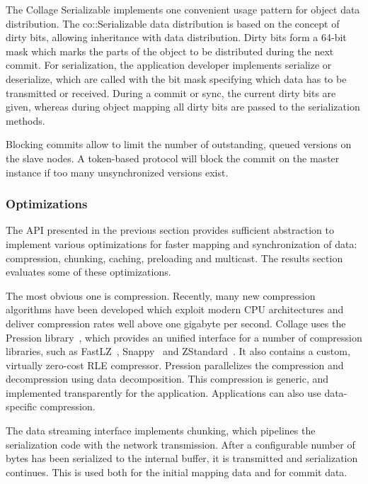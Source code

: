 \documentclass[10pt,journal,compsoc]{IEEEtran}
\begin{document}
\label{sec:Serializable}The \textsf{Collage} Serializable implements one
convenient usage pattern for object data distribution. The
\textsf{co::Serializable} data distribution is based on the concept of dirty
bits, allowing inheritance with data distribution. Dirty bits form a 64-bit mask
which marks the parts of the object to be distributed during the next commit.
For serialization, the application developer implements \textsf{serialize} or
\textsf{deserialize}, which are called with the bit mask specifying which data
has to be transmitted or received. During a commit or sync, the current dirty
bits are given, whereas during object mapping all dirty bits are passed to the
serialization methods.

Blocking commits allow to limit the number of outstanding, queued versions on
the slave nodes. A token-based protocol will block the commit on the master
instance if too many unsynchronized versions exist.

\subsubsection{Optimizations}

The API presented in the previous section provides sufficient abstraction to
implement various optimizations for faster mapping and synchronization of data:
compression, chunking, caching, preloading and multicast. The results section
evaluates some of these optimizations.

The most obvious one is compression. Recently, many new compression algorithms
have been developed which exploit modern CPU architectures and deliver
compression rates well above one gigabyte per second. \textsf{Collage} uses the
Pression library~\cite{pression}, which provides an unified interface for a
number of compression libraries, such as FastLZ~\cite{jesperfast},
Snappy~\cite{snappy} and ZStandard~\cite{zstd}. It also contains a custom,
virtually zero-cost RLE compressor. Pression parallelizes the compression and
decompression using data decomposition. This compression is generic, and
implemented transparently for the application. Applications can also use
data-specific compression.

The data streaming interface implements chunking, which pipelines the
serialization code with the network transmission. After a configurable number of
bytes has been serialized to the internal buffer, it is transmitted and
serialization continues. This is used both for the initial mapping data and for
commit data.
\end{document}
